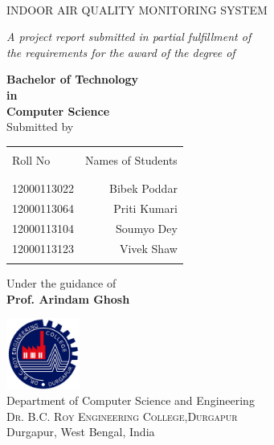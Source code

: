 \begin{titlepage}

\begin{center}

\textup\\

\Large  {INDOOR AIR QUALITY MONITORING SYSTEM}\\
\vspace{.3in}

       \small \emph{ A project report submitted in partial fulfillment of\\
        the requirements for the award of the degree of}
        \vspace{.3in}

       {\bf Bachelor of Technology \\in\\ Computer Science }\\

\normalsize Submitted by \\
\begin{table}[h]
\centering
\begin{tabular}{lr}\hline \\
Roll No & Names of Students \\ \\ \hline
\\
12000113022 & Bibek Poddar \\
12000113064 & Priti Kumari  \\
12000113104 & Soumyo Dey \\ 
12000113123 & Vivek Shaw \\ \\ \hline 
\end{tabular}
\end{table}

\vspace{.1in}
Under the guidance of\\
{\textbf{Prof. Arindam Ghosh}}\\

\vspace{.3in}

\includegraphics[width=0.18\textwidth]{./logo}\\[0.1in]
\Large{Department of Computer Science and Engineering}\\
\normalsize
\textsc{Dr. B.C. Roy Engineering College,Durgapur}\\
Durgapur, West Bengal, India  \\
\vspace{0.2cm}


\end{center}

\end{titlepage}
